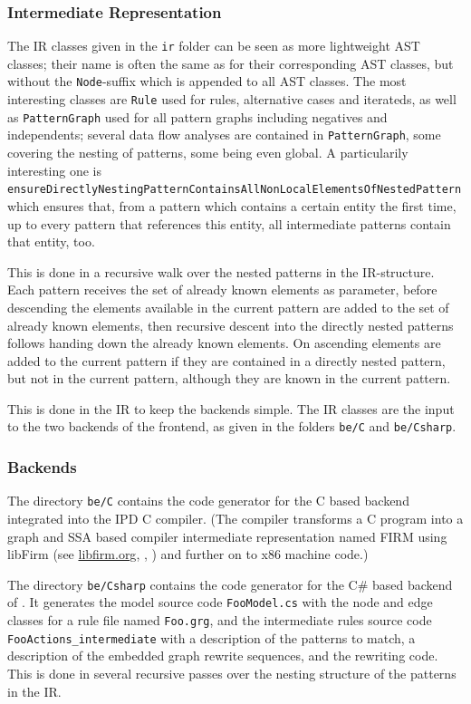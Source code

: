 \subsubsection*{Intermediate Representation}
The IR classes given in the \texttt{ir} folder can be seen as more lightweight AST classes; their name is often the same as for their corresponding AST classes, but without the \texttt{Node}-suffix which is appended to all AST classes.
The most interesting classes are \texttt{Rule} used for rules, alternative cases and iterateds, as well as \texttt{PatternGraph} used for all pattern graphs including negatives and independents;
several data flow analyses are contained in \texttt{PatternGraph}, some covering the nesting of patterns, some being even global.
A particularily interesting one is \texttt{ensure\-Directly\-Nesting\-Pattern\-Contains\-All\-Non\-Local\-Elements\-Of\-Nested\-Pattern} which ensures that, from a pattern which contains a certain entity the first time, up to every pattern that references this entity, all intermediate patterns contain that entity, too.

This is done in a recursive walk over the nested patterns in the IR-structure. 
Each pattern receives the set of already known elements as parameter,
before descending the elements available in the current pattern are added to the set of already known elements,
then recursive descent into the directly nested patterns follows handing down the already known elements.
On ascending elements are added to the current pattern if they are contained in a directly nested pattern, but not in the current pattern, although they are known in the current pattern.

This is done in the IR to keep the backends simple.
The IR classes are the input to the two backends of the frontend, as given in the folders \texttt{be/C} and \texttt{be/Csharp}.


\subsubsection*{Backends}

The directory \texttt{be/C} contains the code generator for the C based backend integrated into the IPD C compiler.
(The compiler transforms a C program into a graph and SSA based compiler intermediate representation named FIRM using libFirm (see \url{libfirm.org}, \cite{TBL:99}, \cite{Lin:02}) and further on to x86 machine code.)

The directory \texttt{be/Csharp} contains the code generator for the C\# based backend of \GrG. 
It generates the model source code \texttt{FooModel.cs} with the node and edge classes for a rule file named \texttt{Foo.grg}, 
and the intermediate rules source code \texttt{FooActions\_intermediate} with a description of the patterns to match, a description of the embedded graph rewrite sequences, and the rewriting code.
This is done in several recursive passes over the nesting structure of the patterns in the IR. 

